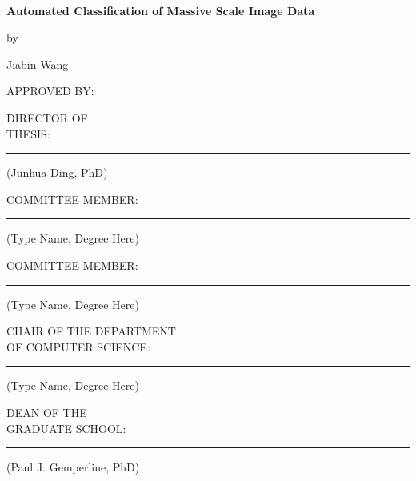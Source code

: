 
\hbox{\ }

\renewcommand{\baselinestretch}{2}
\small \normalsize
\begin{center}
\textbf{Automated Classification of Massive Scale Image Data}
\end{center}
\begin{center}
by
\end{center}
\begin{center}
Jiabin Wang
\end{center}
 
\begin{flushleft}
APPROVED BY:
\end{flushleft}
DIRECTOR OF\\ 
THESIS:
\noindent\rule{14cm}{0.4pt}
\begin{flushright}
\renewcommand{\baselinestretch}{0}
\small\normalsize
(Junhua Ding, PhD)
\end{flushright}
COMMITTEE MEMBER: 
\noindent\rule{10.75cm}{0.4pt}
\begin{flushright}
\renewcommand{\baselinestretch}{0}
\small\normalsize
(Type Name, Degree Here)
\end{flushright}
COMMITTEE MEMBER: 
\noindent\rule{10.75cm}{0.4pt}
\begin{flushright}
\renewcommand{\baselinestretch}{0}
\small\normalsize
(Type Name, Degree Here)
\end{flushright}
CHAIR OF THE DEPARTMENT\\ 
OF COMPUTER SCIENCE:
\noindent\rule{10.4cm}{0.4pt}
\begin{flushright}
\renewcommand{\baselinestretch}{0}
\small\normalsize
(Type Name, Degree Here)
\end{flushright}
DEAN OF THE\\ 
GRADUATE SCHOOL: 
\noindent\rule{11.3cm}{0.4pt}
\begin{flushright}
\renewcommand{\baselinestretch}{0}
\small\normalsize
(Paul J. Gemperline, PhD)
\end{flushright}
	
